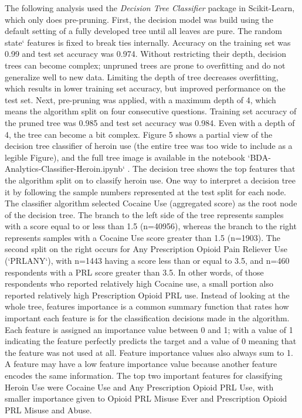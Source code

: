 \documentclass[sigconf]{acmart}
\begin{document}
The following analysis used the \emph{Decision Tree Classifier} package in 
Scikit-Learn, which only does pre-pruning. First, the decision model was build
using the default setting of a fully developed tree until all leaves are pure. 
The random state` features is fixed to break ties internally. Accuracy on the
training set was 0.99 and test set accuracy was 0.974. Without restricting 
their depth, decision trees can become complex; unpruned trees are prone to 
overfitting and do not generalize well to new data. Limiting the depth of 
tree decreases overfitting, which results in lower training set accuracy, 
but improved performance on the test set. Next, pre-pruning was applied, with 
a maximum depth of 4, which means the algorithm split on four consecutive
questions. Training set accuracy of the pruned tree was 0.985 and test set
accuracy was 0.984. Even with a depth of 4, the tree can become a bit complex.
Figure 5 shows a partial view of the decision tree classifier of heroin use 
(the entire tree was too wide to include as a legible Figure), and the full 
tree image is available in the notebook `BDA-Analytics-Classifier-Heroin.ipynb` 
\cite{classifyH}. The decision tree shows the top features that the algorithm 
split on to classify heroin use. One way to interpret a decision tree it by 
following the sample numbers represented at the test split for each node. 
The classifier algorithm selected Cocaine Use (aggregated score) as the root 
node of the decision tree. The branch to the left  side of the tree represents 
samples with a score equal to or less than 1.5 (n=40956), whereas the branch 
to the right represents samples with a Cocaine Use score greater than 1.5
(n=1903). The second split on the right occurs for Any Prescription Opioid 
Pain Reliever Use (`PRLANY`), with n=1443 having a score less than or equal 
to 3.5, and n=460 respondents with a PRL score greater than 3.5. In other 
words, of those respondents who reported relatively high Cocaine use, a small
portion also reported relatively high Prescription Opioid PRL use. Instead of 
looking at the whole tree, features importance is a common summary function 
that rates how important each feature is for the classification decisions 
made in the algorithm. Each feature is assigned an importance value between 
0 and 1; with a value of 1 indicating the feature perfectly predicts the 
target and a value of 0 meaning that the feature was not used at all. 
Feature importance values also always sum to 1. A feature may have a low 
feature importance value because another feature encodes the same information. 
The top two important features for classifying Heroin Use were Cocaine Use 
and Any Prescription Opioid PRL Use, with smaller importance given to Opioid 
PRL Misuse Ever and Prescription Opioid PRL Misuse and Abuse. 
\end{document}
